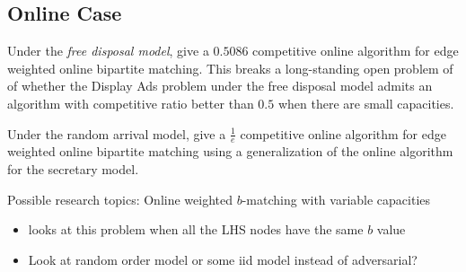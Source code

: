 \subsection{Online Case}

Under the \emph{free disposal model}, \cite{fahrbach2020edge} give a $0.5086$ competitive 
online algorithm for edge weighted online bipartite matching. This breaks a long-standing open 
problem of \cite{mehta2013online} of whether the Display Ads problem under the free disposal model admits 
an algorithm with competitive ratio better than $0.5$ when there are small capacities. 

Under the random arrival model, \cite{kesselheim2013optimal} give a $\frac{1}{e}$ competitive
online algorithm for edge weighted online bipartite matching using a generalization of the
online algorithm for the secretary model. 

Possible research topics: Online weighted $b$-matching with variable capacities 
\begin{itemize}[label=--]
    \item \cite{ting2015near} looks at this problem when all the LHS nodes have the same $b$ value
    \item Look at random order model or some iid model instead of adversarial? 
\end{itemize}